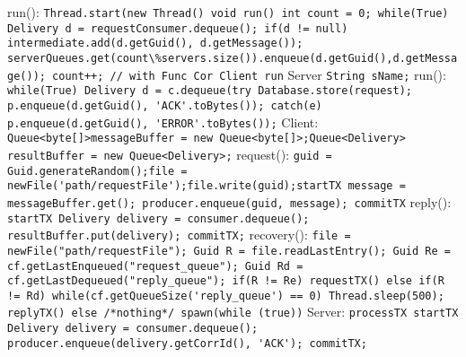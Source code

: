 run():
\lstinline{Thread.start(new Thread() void run() int count = 0; while(True) Delivery d = requestConsumer.dequeue(); if(d != null) intermediate.add(d.getGuid(), d.getMessage()); serverQueues.get(count\%servers.size()).enqueue(d.getGuid(),d.getMessage()); count++; // with Func Cor Client run}
\textbar Server
\lstinline{String sName;}
run():
\lstinline{while(True) Delivery d = c.dequeue(try Database.store(request); p.enqueue(d.getGuid(), 'ACK'.toBytes()); catch(e) p.enqueue(d.getGuid(), 'ERROR'.toBytes());}
\textbar {} Client:
\lstinline{Queue<byte[]>messageBuffer = new Queue<byte[]>;Queue<Delivery> resultBuffer = new Queue<Delivery>;}
request():
\lstinline{guid = Guid.generateRandom();file = newFile('path/requestFile');file.write(guid);startTX message = messageBuffer.get(); producer.enqueue(guid, message); commitTX}
reply():
\lstinline{startTX Delivery delivery = consumer.dequeue(); resultBuffer.put(delivery); commitTX;}
recovery():
\lstinline{file = newFile("path/requestFile"); Guid R = file.readLastEntry(); Guid Re = cf.getLastEnqueued("request_queue"); Guid Rd = cf.getLastDequeued("reply_queue"); if(R != Re) requestTX() else if(R != Rd) while(cf.getQueueSize('reply_queue') == 0) Thread.sleep(500); replyTX() else /*nothing*/ spawn(while (true))}
\textbar Server: \lstinline{processTX startTX Delivery delivery = consumer.dequeue(); producer.enqueue(delivery.getCorrId(), 'ACK'); commitTX;}


